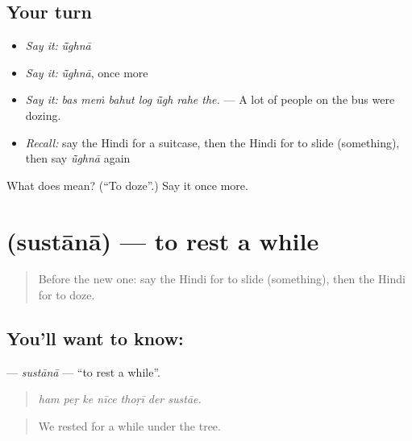 \subsection*{Your turn}
\begin{itemize}
\raggedright
  \item \emph{Say it:} \emph{ū̃ghnā}
  \item \emph{Say it:} \emph{ū̃ghnā}, once more
  \item \emph{Say it:} \emph{bas meṁ bahut log ū̃gh rahe the.} — A lot of people on the bus were dozing.
  \item \emph{Recall:} say the Hindi for a suitcase, then the Hindi for to slide (something), then say \emph{ū̃ghnā} again
\end{itemize}

\begin{tcolorbox}[breakable,colback=teal!4,colframe=teal!35!black,title={Before you move on}]
What does  mean? (\textquotedblleft{}To doze\textquotedblright{}.) Say it once more.
\end{tcolorbox}
\section[\texorpdfstring{\hi{सुस्ताना} (sustānā)}{सुस्ताना (sustānā)}]{ (sustānā) — to rest a while}

\label{lesson:HI-C402-sustana}



\begin{quote}
Before the new one: say the Hindi for to slide (something), then the Hindi for to doze.
\end{quote}

\subsection*{You'll want to know: }
\textbf{} — \emph{sustānā} — \textquotedblleft{}to rest a while\textquotedblright{}.

\begin{quote}
      
\end{quote}

\begin{quote}
\emph{ham peṛ ke nīce thoṛī der sustāe.}
\end{quote}

\begin{quote}
We rested for a while under the tree.
\end{quote}

